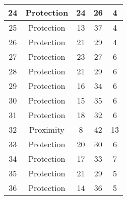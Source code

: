 \documentclass[results.tex]{subfiles}
\begin{document}
\begin{center}
\begin{tabular}{| c || c | c | c | c |}
            \hline
            24                      & Protection                   & 24                     & 26                      & 4                    \\
            \hline
            25                      & Protection                   & 13                     & 37                      & 4                    \\
            \hline
            26                      & Protection                   & 21                     & 29                      & 4                    \\
            \hline
            27                      & Protection                   & 23                     & 27                      & 6                    \\
            \hline
            28                      & Protection                   & 21                     & 29                      & 6                    \\
            \hline
            29                      & Protection                   & 16                     & 34                      & 6                    \\
            \hline
            30                      & Protection                   & 15                     & 35                      & 6                    \\
            \hline
            31                      & Protection                   & 18                     & 32                      & 6                    \\
            \hline
            32                      & Proximity                    & 8                      & 42                      & 13                   \\
            \hline
            33                      & Protection                   & 20                     & 30                      & 6                    \\
            \hline
            34                      & Protection                   & 17                     & 33                      & 7                    \\
            \hline
            35                      & Protection                   & 21                     & 29                      & 5                    \\
            \hline
            36                      & Protection                   & 14                     & 36                      & 5                    \\

\end{tabular}
\end{center}
\end{document}
